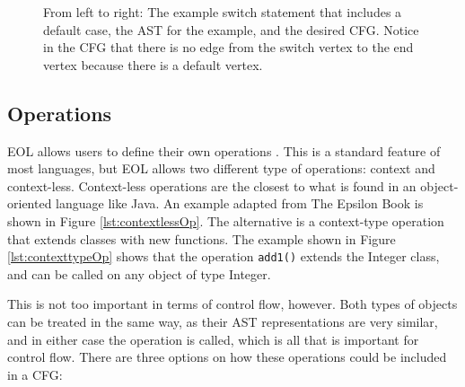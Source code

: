 \begin{figure}
\centering
\begin{minipage}{.4\textwidth}
  \centering
  
\end{minipage}%
\begin{minipage}{.3\textwidth}
  \centering
\end{minipage}
\begin{minipage}{.29\textwidth}
  \centering
\end{minipage}
\caption{From left to right: The example switch statement that includes a default case, the AST for the example, and the desired CFG. Notice in the CFG that there is no edge from the switch vertex to the end vertex because there is a default vertex.}
\label{fig:switch2}
\end{figure}

\subsection{Operations}

EOL allows users to define their own operations \citep{epsilonBook}. This is a standard feature of most languages, but EOL allows two different type of operations: context and context-less. Context-less operations are the closest to what is found in an object-oriented language like Java. An example adapted from The Epsilon Book \citep{epsilonBook} is shown in Figure \ref{lst:contextlessOp}. The alternative is a context-type operation that extends classes with new functions. The example shown in Figure \ref{lst:contexttypeOp} shows that the operation \verb|add1()| extends the Integer class, and can be called on any object of type Integer.

This is not too important in terms of control flow, however. Both types of objects can be treated in the same way, as their AST representations are very similar, and in either case the operation is called, which is all that is important for control flow. There are three options on how these operations could be included in a CFG:

